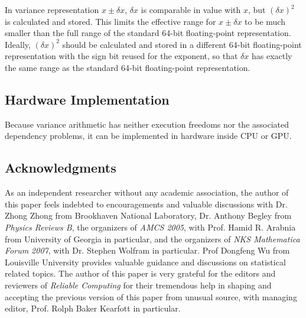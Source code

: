 \documentclass[twoside]{article}
\numberwithin{equation}{section}
\begin{document}
In variance representation $x \pm \delta x$, $\delta x$ is comparable in value with $x$, but $(\delta x)^2$ is calculated and stored.
This limits the effective range for $x \pm \delta x$ to be much smaller than the full range of the standard 64-bit floating-point representation.
Ideally, $(\delta x)^2$ should be calculated and stored in a different 64-bit floating-point representation with the sign bit reused for the exponent, so that $\delta x$ has exactly the same range as the standard 64-bit floating-point representation.  



\subsection{Hardware Implementation}

Because variance arithmetic has neither execution freedoms nor the associated dependency problems, it can be implemented in hardware inside CPU or GPU.



\subsection{Acknowledgments}

As an independent researcher without any academic association, the author of this paper feels indebted to encouragements and valuable discussions with Dr. Zhong Zhong from Brookhaven National Laboratory, Dr. Anthony Begley from \emph{Physics Reviews B}, the organizers of \emph{AMCS 2005}, with Prof. Hamid R. Arabnia from University of Georgia in particular, and the organizers of \emph{NKS Mathematica Forum 2007}, with Dr. Stephen Wolfram in particular. 
Prof Dongfeng Wu from Louisville University provides valuable guidance and discussions on statistical related topics.
The author of this paper is very grateful for the editors and reviewers of \emph{Reliable Computing} for their tremendous help in shaping and accepting the previous version of this paper from unusual source, with managing editor, Prof. Rolph Baker Kearfott in particular.





\end{document}
